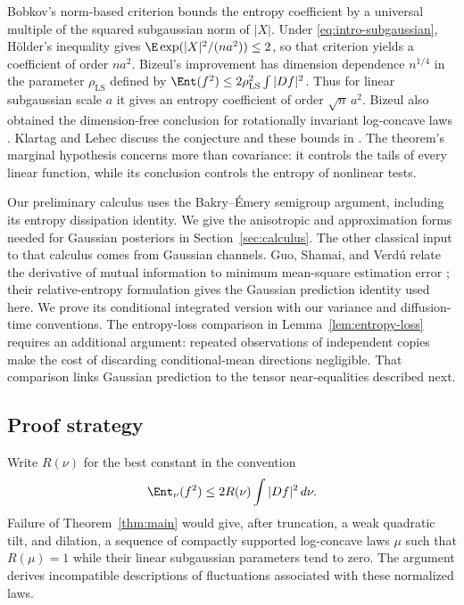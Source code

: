 Bobkov's norm-based criterion
\cite[Theorem~1.3]{Bobkov1999} bounds the entropy coefficient by
a universal multiple of the squared subgaussian norm of $|X|$.
Under \eqref{eq:intro-subgaussian}, H\"older's inequality gives
$\E\exp(|X|^2/(na^2))\le2$, so that criterion yields a coefficient
of order $na^2$.  Bizeul's improvement
\cite[Theorem~4]{Bizeul2026} has dimension dependence $n^{1/4}$
in the parameter $\rho_{\mathrm{LS}}$ defined by
$\Ent(f^2)\le2\rho_{\mathrm{LS}}^2\int|Df|^2$.
Thus for linear subgaussian scale $a$ it gives an entropy coefficient
of order $\sqrt n\,a^2$.
Bizeul also obtained the dimension-free conclusion for rotationally
invariant log-concave laws \cite[Theorem~8]{Bizeul2026}.
Klartag and Lehec discuss the conjecture and these bounds in
\cite[Section~8.3, Conjecture~76 and Theorem~77]{KlartagLehec2024}.
The theorem's marginal hypothesis concerns more than covariance:
it controls the tails of every linear function, while its conclusion
controls the entropy of nonlinear tests.

Our preliminary calculus uses the Bakry--\'Emery semigroup argument,
including its entropy dissipation identity.  We give the anisotropic
and approximation forms needed for Gaussian posteriors in
Section~\ref{sec:calculus}.  The other classical input to that
calculus comes from Gaussian channels.  Guo, Shamai, and Verd\'u
relate the derivative of mutual information to minimum mean-square
estimation error \cite[Theorem~2]{GuoShamaiVerdu2005}; their
relative-entropy formulation \cite[Theorem~5, Equation~(66)]{GuoShamaiVerdu2005}
gives the Gaussian prediction identity used here.  We prove its
conditional integrated version with our variance and diffusion-time
conventions.  The entropy-loss comparison in
Lemma~\ref{lem:entropy-loss} requires an additional argument:
repeated observations of independent copies make the cost of discarding
conditional-mean directions negligible.  That comparison links
Gaussian prediction to the tensor near-equalities described next.

\subsection{Proof strategy}

Write \(R(\nu)\) for the best constant in the convention
\begin{equation}\label{eq:intro-lsi-convention}
 \Ent_\nu(f^2)\le2R(\nu)\int|Df|^2\,d\nu.
\end{equation}
Failure of Theorem~\ref{thm:main} would give, after truncation,
a weak quadratic tilt, and dilation, a sequence of compactly
supported log-concave laws \(\mu\) such that
\(R(\mu)=1\) while their linear subgaussian parameters tend to zero.
The argument derives incompatible descriptions of fluctuations
associated with these normalized laws.

